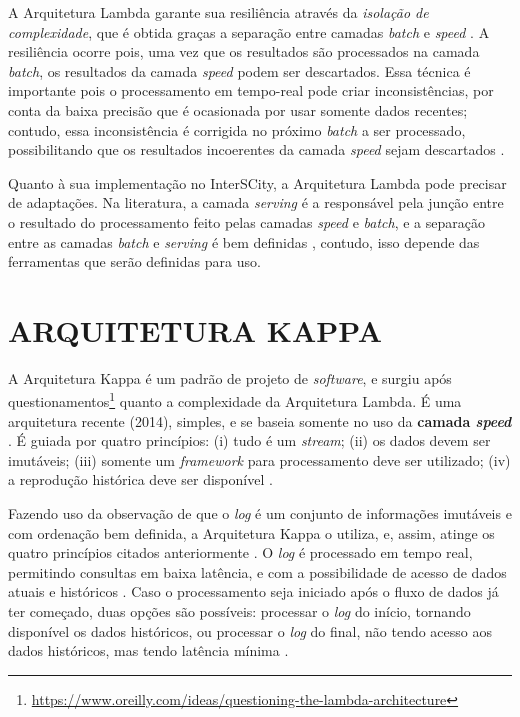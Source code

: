 A Arquitetura Lambda garante sua resiliência através da \textit{isolação de
complexidade}, que é obtida graças a separação entre camadas \textit{batch}
e \textit{speed} \cite{marz2015}. A resiliência ocorre pois, uma vez que os
resultados são processados na camada \textit{batch}, os resultados da camada
\textit{speed} podem ser descartados. Essa técnica é importante pois o
processamento em tempo-real pode criar inconsistências, por conta da baixa
precisão que é ocasionada por usar somente dados recentes; contudo, essa
inconsistência é corrigida no próximo \textit{batch} a ser processado,
possibilitando que os resultados incoerentes da camada \textit{speed} sejam
descartados \cite{marz2015}.

Quanto à sua implementação no InterSCity, a Arquitetura Lambda pode precisar de
adaptações. Na literatura, a camada \textit{serving} é a responsável pela
junção entre o resultado do processamento feito pelas camadas \textit{speed} e
\textit{batch}, e a separação entre as camadas \textit{batch} e \textit{serving}
é bem definidas \cite{marz2015}, contudo, isso depende das ferramentas que
serão definidas para uso. 

\section{ARQUITETURA KAPPA}

A Arquitetura Kappa é um padrão de projeto de \textit{software}, e surgiu após
questionamentos\footnote{\url{https://www.oreilly.com/ideas/questioning-the-lambda-architecture}}
quanto a complexidade da Arquitetura Lambda. É uma arquitetura recente (2014),
simples, e se baseia somente no uso da \textbf{camada \textit{speed}}
\cite{seyvet2016}. É guiada por quatro princípios:
(i) tudo é um \textit{stream}; (ii) os dados devem ser imutáveis; (iii)
somente um \textit{framework} para processamento deve ser utilizado; (iv) a
reprodução histórica deve ser disponível \cite{seyvet2016}.

Fazendo uso da observação de que o \textit{log} é um conjunto de informações
imutáveis e com ordenação bem definida, a Arquitetura Kappa o utiliza, e,
assim, atinge os quatro princípios citados anteriormente \cite{kreps2014}. O
\textit{log} é processado em tempo real, permitindo consultas em baixa
latência, e com a possibilidade de acesso de dados atuais e históricos
\cite{forgeat2015}. Caso o processamento seja iniciado após o fluxo de dados já
ter começado, duas opções são possíveis: processar o \textit{log} do início,
tornando disponível os dados históricos, ou processar o \textit{log} do final,
não tendo acesso aos dados históricos, mas tendo latência mínima
\cite{kreps2014}.

